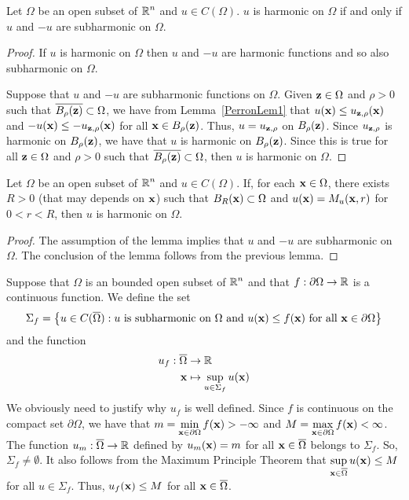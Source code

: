 \begin{lemma}
Let $\Omega$ be an open subset of $\displaystyle \mathbb{R}^n$ and $u \in C(\Omega)$.
$u$ is harmonic on $\Omega$ if and only if $u$ and $-u$ are
subharmonic on $\Omega$.
\end{lemma}

\begin{proof}
\stage{$\mathbf{\Rightarrow}$}
If $u$ is harmonic on $\Omega$ then $u$ and $-u$ are harmonic functions
and so also subharmonic on $\Omega$.

\stage{$\mathbf{\Leftarrow}$}
Suppose that $u$ and $-u$ are subharmonic functions on $\Omega$.
Given $\mathbf{z} \in \Omega$ and $\rho >0$ such that
$\overline{B_{\rho}(\mathbf{z})} \subset \Omega$, we have from
Lemma~\ref{PerronLem1} that
$u(\mathbf{x}) \leq u_{\mathbf{z},\rho}(\mathbf{x})$ and
$-u(\mathbf{x}) \leq -u_{\mathbf{z},\rho}(\mathbf{x})$ for all
$\mathbf{x} \in B_{\rho}(\mathbf{z})$.  Thus,
$u = u_{\mathbf{z},\rho}$ on $B_{\rho}(\mathbf{z})$.  Since 
$u_{\mathbf{z},\rho}$ is harmonic on $B_{\rho}(\mathbf{z})$, we have that
$u$ is harmonic on $B_{\rho}(\mathbf{z})$.  Since this is true for all
$\mathbf{z} \in \Omega$ and $\rho>0$ such that
$\overline{B_{\rho}(\mathbf{z})} \subset \Omega$, then $u$ is harmonic on
$\Omega$.
\end{proof}

\begin{lemma}
Let $\Omega$ be an open subset of $\displaystyle \mathbb{R}^n$ and $u \in C(\Omega)$.
If, for each $\mathbf{x} \in \Omega$, there exists $R>0$ (that may depends
on $\mathbf{x}$) such that $B_R(\mathbf{x}) \subset \Omega$ and
$u(\mathbf{x}) = M_u(\mathbf{x},r)$ for $0 < r < R$, then
$u$ is harmonic on $\Omega$.
\end{lemma}

\begin{proof}
The assumption of the lemma implies that $u$ and $-u$ are subharmonic
on $\Omega$.  The conclusion of the lemma follows from the previous
lemma.
\end{proof}

Suppose that $\Omega$ is an bounded open subset of $\displaystyle \mathbb{R}^n$
and that $\displaystyle f: \partial \Omega \to \mathbb{R}$ is a continuous
function.  We define the set
\[
\Sigma_f = \left\{ u \in C(\overline{\Omega}) :
u \ \text{is subharmonic on} \ \Omega \ \text{and} \ u(\mathbf{x}) \leq f(\mathbf{x})
\ \text{for all} \ \mathbf{x} \in \partial \Omega \right \}
\]
and the function
\begin{align*}
u_f : \overline{\Omega} &\to \mathbb{R} \\
\mathbf{x} &\mapsto \sup_{u \in \Sigma_f} u(\mathbf{x})
\end{align*}
We obviously need to justify why $u_f$ is well defined.
Since $f$ is continuous on the compact set $\partial \Omega$, we have
that
$\displaystyle m = \min_{\mathbf{x} \in \partial \Omega} f(\mathbf{x})
> -\infty$ and
$\displaystyle M = \max_{\mathbf{x} \in \partial \Omega} f(\mathbf{x})
< \infty$.  The function $u_m:\overline{\Omega} \to \mathbb{R}$ defined by
$u_m(\mathbf{x}) = m$ for all $\mathbf{x} \in \overline{\Omega}$ belongs to
$\Sigma_f$.  So, $\Sigma_f \neq \emptyset$.  It also follows from the
Maximum Principle Theorem that
$\displaystyle \sup_{\mathbf{x} \in \overline{\Omega}} u(\mathbf{x}) \leq M$
for all $u \in \Sigma_f$.
Thus, $u_f(\mathbf{x}) \leq M$ for all $\mathbf{x} \in \overline{\Omega}$.

